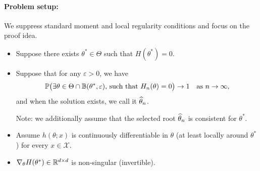 \documentclass[11pt,letterpaper]{article}
\numberwithin{assumption}{lecture}
\numberwithin{theorem}{lecture}
\numberwithin{proposition}{lecture}
\numberwithin{lemma}{lecture}
\numberwithin{claim}{lecture}
\numberwithin{corollary}{lecture}
\numberwithin{definition}{lecture}
\numberwithin{conjecture}{lecture}
\numberwithin{remark}{lecture}
\numberwithin{example}{lecture}
\numberwithin{equation}{lecture}
\begin{document}
\paragraph{Problem setup:} We suppress standard moment and local regularity conditions and focus on the proof idea.
\begin{itemize}
  \item Suppose there exists $\theta^* \in \Theta$ such that $H (\theta^*) = 0$.
  \item Suppose that for any $\varepsilon > 0$,
  we have
  \begin{align*}
    {\mathbb{P}} \big( \text{$\exists \theta \in \Theta \cap \mathbb{B} (\theta^*, \varepsilon)$, such that $H_n (\theta) = 0$} \big) \to 1 \quad \text{as } n \to \infty,
  \end{align*}
and when the solution exists, we call it $\widehat{\theta}_n$.

{\color{blue} Note: we additionally assume that the selected root $\widehat{\theta}_n$ is consistent for $\theta^*$.}

\item Assume $h (\theta; x)$ is continuously differentiable in $\theta$ (at least locally around $\theta^*$) for every $x \in \mathcal{X}$.
\item $\nabla_\theta H (\theta^*) \in \mathbb{R}^{d \times d}$ is non-singular (invertible).
\end{itemize}
\end{document}

